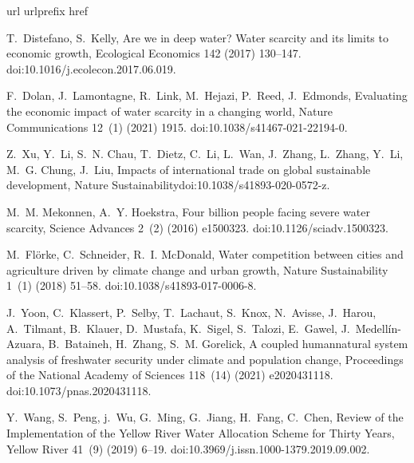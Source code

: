 \documentclass[preprint, 12pt]{elsarticle}
\providecommand{\DIFaddend}{} %
\begin{document}
\DIFaddend \begin{thebibliography}{10}
\expandafter\ifx\csname url\endcsname\relax
  \def\url#1{\texttt{#1}}\fi
\expandafter\ifx\csname urlprefix\endcsname\relax\def\urlprefix{URL }\fi
\expandafter\ifx\csname href\endcsname\relax
  \def\href#1#2{#2} \def\path#1{#1}\fi

T.~Distefano, S.~Kelly, Are we in deep water? {{Water}} scarcity and its limits
  to economic growth, Ecological Economics 142 (2017) 130--147.
\newblock \href {http://dx.doi.org/10.1016/j.ecolecon.2017.06.019}
  {\path{doi:10.1016/j.ecolecon.2017.06.019}}.

F.~Dolan, J.~Lamontagne, R.~Link, M.~Hejazi, P.~Reed, J.~Edmonds, Evaluating
  the economic impact of water scarcity in a changing world, Nature
  Communications 12~(1) (2021) 1915.
\newblock \href {http://dx.doi.org/10.1038/s41467-021-22194-0}
  {\path{doi:10.1038/s41467-021-22194-0}}.

Z.~Xu, Y.~Li, S.~N. Chau, T.~Dietz, C.~Li, L.~Wan, J.~Zhang, L.~Zhang, Y.~Li,
  M.~G. Chung, J.~Liu, Impacts of international trade on global sustainable
  development, Nature Sustainability\href
  {http://dx.doi.org/10.1038/s41893-020-0572-z}
  {\path{doi:10.1038/s41893-020-0572-z}}.

M.~M. Mekonnen, A.~Y. Hoekstra, Four billion people facing severe water
  scarcity, Science Advances 2~(2) (2016) e1500323.
\newblock \href {http://dx.doi.org/10.1126/sciadv.1500323}
  {\path{doi:10.1126/sciadv.1500323}}.

M.~Fl{\"o}rke, C.~Schneider, R.~I. McDonald, Water competition between cities
  and agriculture driven by climate change and urban growth, Nature
  Sustainability 1~(1) (2018) 51--58.
\newblock \href {http://dx.doi.org/10.1038/s41893-017-0006-8}
  {\path{doi:10.1038/s41893-017-0006-8}}.

J.~Yoon, C.~Klassert, P.~Selby, T.~Lachaut, S.~Knox, N.~Avisse, J.~Harou,
  A.~Tilmant, B.~Klauer, D.~Mustafa, K.~Sigel, S.~Talozi, E.~Gawel,
  J.~{Medell{\'i}n-Azuara}, B.~Bataineh, H.~Zhang, S.~M. Gorelick, A coupled
  human\textendash natural system analysis of freshwater security under climate
  and population change, Proceedings of the National Academy of Sciences
  118~(14) (2021) e2020431118.
\newblock \href {http://dx.doi.org/10.1073/pnas.2020431118}
  {\path{doi:10.1073/pnas.2020431118}}.

Y.~Wang, S.~Peng, j.~Wu, G.~Ming, G.~Jiang, H.~Fang, C.~Chen, {Review of the
  Implementation of the Yellow River Water Allocation Scheme for Thirty Years},
  Yellow River 41~(9) (2019) 6--19.
\newblock \href {http://dx.doi.org/10.3969/j.issn.1000-1379.2019.09.002}
  {\path{doi:10.3969/j.issn.1000-1379.2019.09.002}}.


\end{thebibliography}
\end{document}
